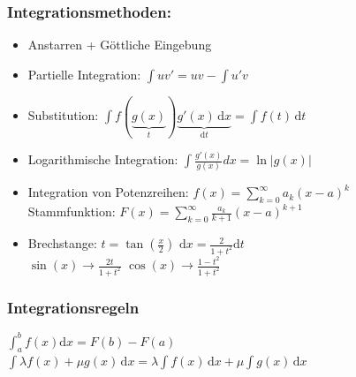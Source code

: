 \documentclass[6pt,a4paper]{scrartcl}
\newcommand{\abs}[1]{\ensuremath{\left\vert#1\right\vert}}
\begin{document}
\begin{multicols*}{4}
\subsubsection{Integrationsmethoden:}
\begin{itemize}\itemsep0pt
\item Anstarren + Göttliche Eingebung
\item Partielle Integration: $\int uv'=uv-\int u'v$
\item Substitution: $\int f(\underbrace {g(x)}_{t}) \underbrace {g'(x)\,\mathrm dx}_{\mathrm dt}=\int f(t)\, \mathrm dt$
\item Logarithmische Integration: $\int \frac{g'(x)}{g(x)}dx=\ln\abs{g(x)}$
\item Integration von Potenzreihen: $f(x)=\sum_{k=0}^{\infty}a_k(x-a)^k$ \\
Stammfunktion: $F(x)=\sum_{k=0}^{\infty}\frac{a_k}{k+1}(x-a)^{k+1}$
\item Brechstange: $t=\tan(\frac{x}{2})$ \quad $\mathrm dx = \frac{2}{1+t^2} \mathrm dt$ \\ $\sin(x) \rightarrow \frac{2t}{1+t^2}$ \qquad $\cos(x) \rightarrow \frac{1-t^2}{1+t^2}$
\end{itemize}

\subsubsection{Integrationsregeln}
$\int_a^b f(x) \mathrm dx = F(b) - F(a)$\\
$\int\lambda f(x)+\mu g(x) \, \mathrm dx=\lambda\int f(x) \, \mathrm dx + \mu\int g(x) \, \mathrm dx$


\end{multicols*}
\end{document}
